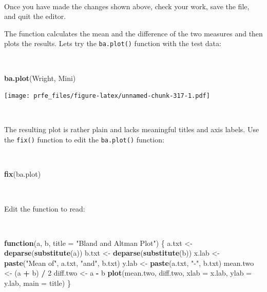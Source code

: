 \documentclass[12pt,a4paper]{book}
\newenvironment{Shaded}{\begin{snugshade}}{\end{snugshade}}
\newcommand{\ControlFlowTok}[1]{\textcolor[rgb]{0.13,0.29,0.53}{\textbf{#1}}}
\newcommand{\DataTypeTok}[1]{\textcolor[rgb]{0.13,0.29,0.53}{#1}}
\newcommand{\DecValTok}[1]{\textcolor[rgb]{0.00,0.00,0.81}{#1}}
\newcommand{\KeywordTok}[1]{\textcolor[rgb]{0.13,0.29,0.53}{\textbf{#1}}}
\newcommand{\NormalTok}[1]{#1}
\newcommand{\OperatorTok}[1]{\textcolor[rgb]{0.81,0.36,0.00}{\textbf{#1}}}
\newcommand{\StringTok}[1]{\textcolor[rgb]{0.31,0.60,0.02}{#1}}
\theoremstyle{definition}
\theoremstyle{definition}
\theoremstyle{definition}
\theoremstyle{remark}
\begin{document}
~

Once you have made the changes shown above, check your work, save the
file, and quit the editor.

The function calculates the mean and the difference of the two measures
and then plots the results. Lets try the \texttt{ba.plot()} function
with the test data:

~

\begin{Shaded}
\begin{Highlighting}[]
\KeywordTok{ba.plot}\NormalTok{(Wright, Mini)}
\end{Highlighting}
\end{Shaded}

\texttt{[image: prfe\_files/figure-latex/unnamed-chunk-317-1.pdf]}

~

The resulting plot is rather plain and lacks meaningful titles and axis
labels. Use the \texttt{fix()} function to edit the \texttt{ba.plot()}
function:

~

\begin{Shaded}
\begin{Highlighting}[]
\KeywordTok{fix}\NormalTok{(ba.plot)}
\end{Highlighting}
\end{Shaded}

~

Edit the function to read:

~

\begin{Shaded}
\begin{Highlighting}[]
\ControlFlowTok{function}\NormalTok{(a, b, }\DataTypeTok{title =} \StringTok{"Bland and Altman Plot"}\NormalTok{) \{}
\NormalTok{  a.txt <-}\StringTok{ }\KeywordTok{deparse}\NormalTok{(}\KeywordTok{substitute}\NormalTok{(a))}
\NormalTok{  b.txt <-}\StringTok{ }\KeywordTok{deparse}\NormalTok{(}\KeywordTok{substitute}\NormalTok{(b))}
\NormalTok{  x.lab <-}\StringTok{ }\KeywordTok{paste}\NormalTok{(}\StringTok{"Mean of"}\NormalTok{, a.txt, }\StringTok{"and"}\NormalTok{, b.txt)}
\NormalTok{  y.lab <-}\StringTok{ }\KeywordTok{paste}\NormalTok{(a.txt, }\StringTok{"-"}\NormalTok{, b.txt)}
\NormalTok{  mean.two <-}\StringTok{ }\NormalTok{(a }\OperatorTok{+}\StringTok{ }\NormalTok{b) }\OperatorTok{/}\StringTok{ }\DecValTok{2}
\NormalTok{  diff.two <-}\StringTok{ }\NormalTok{a }\OperatorTok{-}\StringTok{ }\NormalTok{b}
  \KeywordTok{plot}\NormalTok{(mean.two, diff.two, }\DataTypeTok{xlab =}\NormalTok{ x.lab, }\DataTypeTok{ylab =}\NormalTok{ y.lab, }\DataTypeTok{main =}\NormalTok{ title)}
\NormalTok{\}}
\end{Highlighting}
\end{Shaded}
\end{document}
